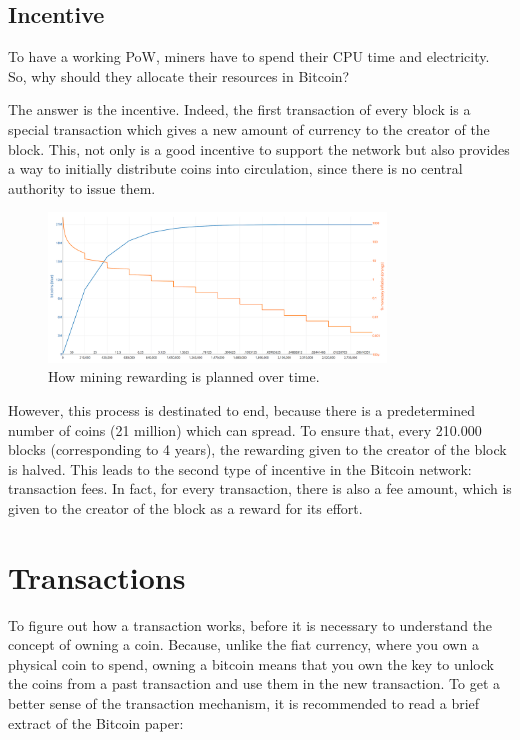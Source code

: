 \subsection{Incentive}
\label{sec:incentive}

To have a working PoW, miners have to spend their CPU time and electricity. So, why 
should they allocate their resources in Bitcoin?

The answer is the incentive. Indeed, the first transaction of every block is a special
transaction which gives a new amount of currency to the creator of the block. This, 
not only is a good incentive to support the network but also provides a way to initially 
distribute coins into circulation, since there is no central authority to issue them.
\begin{figure}[!h]
    \centering
    \includegraphics[width = 0.8\textwidth]{rewarding.png}
    \caption{How mining rewarding is planned over time.\cite{rewarding}}
    \label{fig:claim}
\end{figure} 
However, this process is destinated to end, because there is a predetermined number
of coins (21 million) which can spread. To ensure that, every 210.000 blocks 
(corresponding to 4 years), the rewarding given to the creator of the block is halved.
This leads to the second type of incentive in the Bitcoin network: transaction fees.
In fact, for every transaction, there is also a fee amount, which is given to the 
creator of the block as a reward for its effort.




\section{Transactions}
\label{sec:transactions}

To figure out how a transaction works, before it is necessary to understand the concept of
owning a coin. Because, unlike the fiat currency, where you own a physical coin
to spend, owning a bitcoin means that you own the key to unlock the coins from a past
transaction and use them in the new transaction. To get a better sense of the 
transaction mechanism, it is recommended to read a brief extract of the Bitcoin paper: 


